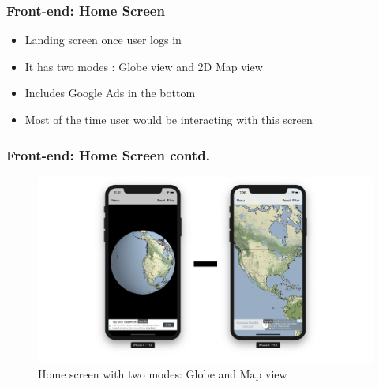 \begin{frame}
\frametitle{Front-end: Home Screen}
   \begin{itemize}
       \item Landing screen once user logs in
       \item It has two modes : Globe view and 2D Map view
       \item Includes Google Ads in the bottom
       \item Most of the time user would be interacting with this screen
   \end{itemize}
\end{frame}

\begin{frame}
\frametitle{Front-end: Home Screen contd.}
   \begin{figure}[H]
            \centering
            \includegraphics[width=0.95\linewidth]{final/figures/home_modes.png}
            \caption{Home screen with two modes: Globe and Map view}
    \end{figure}
\end{frame}


